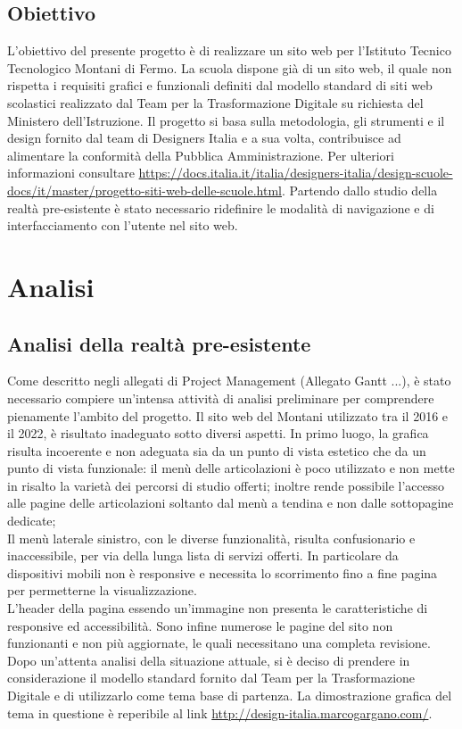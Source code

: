 \documentclass{article}
\begin{document}
	 \subsection{\textbf{Obiettivo}} 
	\flushleft
	\normalsize
	L'obiettivo del presente progetto è di realizzare un sito web per l'Istituto Tecnico Tecnologico Montani di Fermo. La scuola dispone già di un sito web, il quale non rispetta i requisiti grafici e funzionali definiti dal modello standard di siti web scolastici realizzato dal Team per la Trasformazione Digitale su richiesta del Ministero dell'Istruzione. Il progetto si basa sulla metodologia, gli strumenti e il design fornito dal team di Designers Italia e a sua volta, contribuisce ad alimentare la conformità della Pubblica Amministrazione. Per ulteriori informazioni consultare \url{https://docs.italia.it/italia/designers-italia/design-scuole-docs/it/master/progetto-siti-web-delle-scuole.html}. Partendo dallo studio della realtà pre-esistente è stato necessario ridefinire le modalità di navigazione e di interfacciamento con l'utente nel sito web.

	\section{\textbf{Analisi}} 
	
    \subsection{\textbf{Analisi della realtà pre-esistente}}
    Come descritto negli allegati di Project Management (Allegato Gantt ...), è stato necessario compiere un'intensa attività di analisi preliminare per comprendere pienamente l'ambito del progetto.
	Il sito web del Montani utilizzato tra il 2016 e il 2022, è risultato inadeguato sotto diversi aspetti. In primo luogo, la grafica risulta incoerente  e non adeguata sia da un punto di vista estetico che da un punto di vista funzionale: il menù delle articolazioni è poco utilizzato e non mette in risalto la varietà dei percorsi di studio offerti; inoltre rende possibile l'accesso alle pagine delle articolazioni soltanto dal menù a tendina e non dalle sottopagine dedicate;\\
	Il menù laterale sinistro, con le diverse funzionalità, risulta confusionario e inaccessibile, per via della lunga lista di servizi offerti. In particolare da dispositivi mobili non è responsive e necessita lo scorrimento fino a fine pagina per permetterne la visualizzazione.\\
	L'header della pagina essendo un'immagine non presenta le caratteristiche di responsive ed accessibilità.
	Sono infine numerose le pagine del sito non funzionanti e non più aggiornate, le quali necessitano una completa revisione.
	Dopo un'attenta analisi della situazione attuale, si è deciso di prendere in considerazione il modello standard fornito dal Team per la Trasformazione Digitale e di utilizzarlo come tema base di partenza.
	La dimostrazione grafica del tema in questione è reperibile al link \url{http://design-italia.marcogargano.com/}.
	
\end{document}
